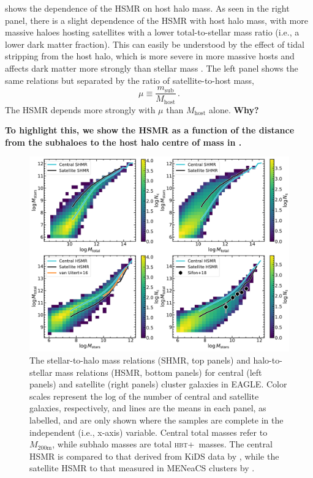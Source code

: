 \documentclass[usenatbib,fleqn]{mnras}
\newcommand{\comment}[1]{\textbf{\color{magenta} #1}}
\newcommand{\eagle}{EAGLE}
\newcommand{\hbt}{\textsc{hbt+}}
\newcommand{\msub}{m_\mathrm{sub}}
\newcommand{\Mhost}{M_\mathrm{host}}
\begin{document}
 shows the dependence of the HSMR on host halo mass. As seen in the right panel, there is a slight dependence of the HSMR with host halo mass, with more massive haloes hosting satellites with a lower total-to-stellar mass ratio (i.e., a lower dark matter fraction). This can easily be understood by the effect of tidal stripping from the host halo, which is more severe in more massive hosts and affects dark matter more strongly than stellar mass \citep[e.g.,][]{}. The left panel shows the same relations but separated by the ratio of satellite-to-host mass,
\begin{equation}\label{eq:mu}
  \mu \equiv \frac{\msub}{\Mhost} \,.
\end{equation}
The HSMR depends more strongly with $\mu$ than $\Mhost$ alone. \comment{Why?}

\comment{To highlight this, we show the HSMR as a function of the distance from the subhaloes to the host halo centre of mass in \Cref{fig:hsmr_R}.}


\begin{figure}
  \centerline{\includegraphics[width=\linewidth]{shmr_censat.pdf}}
  \caption{The stellar-to-halo mass relations (SHMR, top panels) and halo-to-stellar mass relations (HSMR, bottom panels) for central (left panels) and satellite (right panels) cluster galaxies in \eagle. Color scales represent the log of the number of central and satellite galaxies, respectively, and lines are the means in each panel, as labelled, and are only shown where the samples are complete in the independent (i.e., x-axis) variable. Central total masses refer to $M_\mathrm{200m}$, while subhalo masses are total \hbt\ masses. The central HSMR is compared to that derived from KiDS data by \citet{vanuitert16}, while the satellite HSMR to that measured in MENeaCS clusters by \citet{sifon18_meneacs}.}
  \label{f:shmr_now}
\end{figure}
\end{document}
